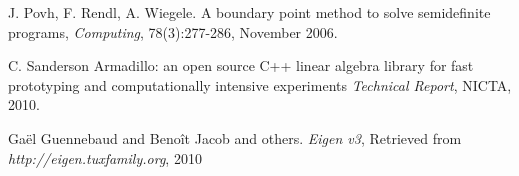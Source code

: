 \documentclass[12pt]{article}
\numberwithin{equation}{section}
\begin{document}
\newpage

\begin{thebibliography}{9}
J. Povh, F. Rendl, A. Wiegele. 
A boundary point method to solve semidefinite programs,
\textit{Computing}, 78(3):277-286, November 2006.
 
C. Sanderson 
Armadillo: an open source C++ linear algebra library for fast prototyping and computationally intensive experiments
\textit{Technical Report}, NICTA, 2010.
 
Ga\"{e}l Guennebaud and Beno\^{i}t Jacob and others.
\textit{Eigen v3},
Retrieved from \textit{http://eigen.tuxfamily.org}, 2010
\end{thebibliography}
\end{document}
